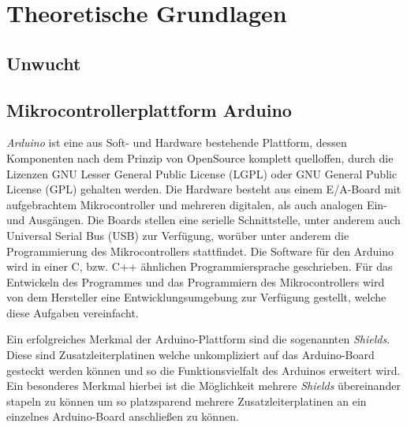 
\chapter{Theoretische Grundlagen}

\section{Unwucht}

\section{Mikrocontrollerplattform Arduino}
\textit{Arduino} ist eine aus Soft- und Hardware bestehende Plattform, dessen Komponenten nach dem Prinzip von OpenSource komplett quelloffen, durch die Lizenzen GNU Lesser General Public License (LGPL) oder GNU General Public License (GPL) gehalten werden. Die Hardware besteht aus einem E/A-Board mit aufgebrachtem Mikrocontroller und mehreren digitalen, als auch analogen Ein- und Ausgängen. Die Boards stellen eine serielle Schnittstelle, unter anderem auch Universal Serial Bus (USB) zur Verfügung, worüber unter anderem die Programmierung des Mikrocontrollers stattfindet. Die Software für den Arduino wird in einer C, bzw. C++ ähnlichen Programmiersprache geschrieben. Für das Entwickeln des Programmes und das Programmiern des Mikrocontrollers wird von dem Hersteller eine Entwicklungsumgebung zur Verfügung gestellt, welche diese Aufgaben vereinfacht.

Ein erfolgreiches Merkmal der Arduino-Plattform sind die sogenannten \textit{Shields}. Diese sind Zusatzleiterplatinen welche unkompliziert auf das Arduino-Board gesteckt werden können und so die Funktionsvielfalt des Arduinos erweitert wird. Ein besonderes Merkmal hierbei ist die Möglichkeit mehrere \textit{Shields} übereinander stapeln zu können um so platzsparend mehrere Zusatzleiterplatinen an ein einzelnes Arduino-Board anschließen zu können.
